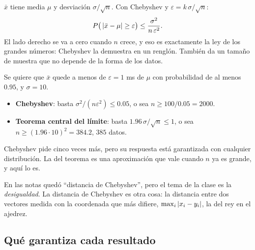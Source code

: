 \documentclass[11pt,letterpaper]{article}
\begin{document}
$\bar{x}$ tiene media $\mu$ y desviación $\sigma / \sqrt{n}$. Con
Chebyshev y $\varepsilon = k\,\sigma / \sqrt{n}$:
\[
    P\big( \left\lvert \bar{x} - \mu \right\rvert \ge \varepsilon \big)
    \le \frac{\sigma^2}{n\, \varepsilon^2} .
\]
El lado derecho se va a cero cuando $n$ crece, y eso es exactamente la
ley de los grandes números: Chebyshev la demuestra en un renglón.
También da un tamaño de muestra que no depende de la forma de los
datos.

\begin{ejemplo}
    Se quiere que $\bar{x}$ quede a menos de $\varepsilon = 1$ ms de
    $\mu$ con probabilidad de al menos $0.95$, y $\sigma = 10$.
    \begin{itemize}[itemsep=0.3em]
        \item \textbf{Chebyshev}: basta
              $\sigma^2 / (n \varepsilon^2) \le 0.05$, o sea
              $n \ge 100 / 0.05 = 2000$.
        \item \textbf{Teorema central del límite}: basta
              $1.96\, \sigma / \sqrt{n} \le 1$, o sea
              $n \ge (1.96 \cdot 10)^2 = 384.2$, $385$ datos.
    \end{itemize}
    Chebyshev pide cinco veces más, pero su respuesta está garantizada
    con cualquier distribución. La del teorema es una aproximación que
    vale cuando $n$ ya es grande, y aquí lo es.
\end{ejemplo}

\begin{ojo}
    En las notas quedó ``distancia de Chebyshev'', pero el tema de la
    clase es la \emph{desigualdad}. La distancia de Chebyshev es otra
    cosa: la distancia entre dos vectores medida con la coordenada que
    más difiere, $\max_i \left\lvert x_i - y_i \right\rvert$, la del rey en el ajedrez.
\end{ojo}


\subsection*{Qué garantiza cada resultado}
\end{document}
